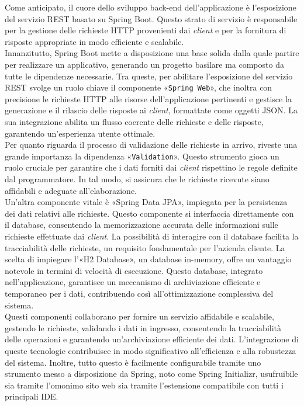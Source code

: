 Come anticipato, il cuore dello sviluppo back-end dell’applicazione è l’esposizione del servizio REST basato su Spring Boot. Questo strato di servizio è responsabile per la gestione delle richieste HTTP provenienti dai \textit{client} e per la fornitura di risposte appropriate in modo efficiente e scalabile.\\
Innanzitutto, Spring Boot mette a disposizione una base solida dalla quale partire per realizzare un applicativo, generando un progetto basilare ma composto da tutte le dipendenze necessarie. Tra queste, per abilitare l'esposizione del servizio REST svolge un ruolo chiave il componente «\texttt{Spring Web}», che inoltra con precisione le richieste HTTP alle risorse dell'applicazione pertinenti e gestisce la generazione e il rilascio delle risposte ai \textit{client}, formattate come oggetti JSON. La sua integrazione abilita un flusso coerente delle richieste e delle risposte, garantendo un'esperienza utente ottimale.\\
Per quanto riguarda il processo di validazione delle richieste in arrivo, riveste una grande importanza la dipendenza «\texttt{Validation}». Questo strumento gioca un ruolo cruciale per garantire che i dati forniti dai \textit{client} rispettino le regole definite dal programmatore. In tal modo, si assicura che le richieste ricevute siano affidabili e adeguate all'elaborazione.\\
Un'altra componente vitale è «Spring Data JPA», impiegata per la persistenza dei dati relativi alle richieste. Questo componente si interfaccia direttamente con il database, consentendo la memorizzazione accurata delle informazioni sulle richieste effettuate dai \textit{client}. La possibilità di interagire con il database facilita la tracciabilità delle richieste, un requisito fondamentale per l'azienda cliente. La scelta di impiegare l'«H2 Database», un database in-memory, offre un vantaggio notevole in termini di velocità di esecuzione. Questo database, integrato nell'applicazione, garantisce un meccanismo di archiviazione efficiente e temporaneo per i dati, contribuendo così all'ottimizzazione complessiva del sistema.\\
Questi componenti collaborano per fornire un servizio affidabile e scalabile, gestendo le richieste, validando i dati in ingresso, consentendo la tracciabilità delle operazioni e garantendo un'archiviazione efficiente dei dati. L'integrazione di queste tecnologie contribuisce in modo significativo all'efficienza e alla robustezza del sistema. Inoltre, tutto questo è facilmente configurabile tramite uno strumento messo a disposizione da Spring, noto come Spring Initializr, usufruibile sia tramite l’omonimo sito web sia tramite l’estensione compatibile con tutti i principali IDE.
